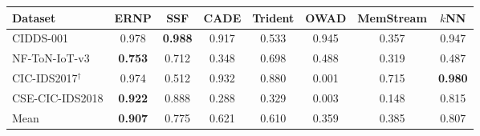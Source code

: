\begin{tabular}{lccccccc}
\toprule
Dataset & ERNP & SSF & CADE & Trident & OWAD & MemStream & $k$NN\\
\midrule
CIDDS-001 & 0.978 & \textbf{0.988} & 0.917 & 0.533 & 0.945 & 0.357 & 0.947\\
NF-ToN-IoT-v3 & \textbf{0.753} & 0.712 & 0.348 & 0.698 & 0.488 & 0.319 & 0.487\\
CIC-IDS2017$^\dagger$ & 0.974 & 0.512 & 0.932 & 0.880 & 0.001 & 0.715 & \textbf{0.980}\\
CSE-CIC-IDS2018 & \textbf{0.922} & 0.888 & 0.288 & 0.329 & 0.003 & 0.148 & 0.815\\
\midrule
Mean & \textbf{0.907} & 0.775 & 0.621 & 0.610 & 0.359 & 0.385 & 0.807\\
\bottomrule
\end{tabular}
